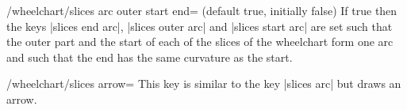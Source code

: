 \documentclass[a4paper,english,dvipsnames]{ltxdoc}
\begin{document}
\begin{key}{/wheelchart/slices arc outer start end= (default true, initially false)}
If true then the keys |slices end arc|, |slices outer arc| and |slices start arc| are set such that the outer part and the start of each of the slices of the wheelchart form one arc and such that the end has the same curvature as the start.
\end{key}
\begin{key}{/wheelchart/slices arrow=}
This key is similar to the key |slices arc| but draws an arrow.
\begin{codeexample}[width=10cm]
\begin{tikzpicture}
\wheelchart[
    gap=0.3,
    slices arrow={1}{-1}
]{\exampleforthismanual}
\end{tikzpicture}
\end{codeexample}
\end{key}
\end{document}
